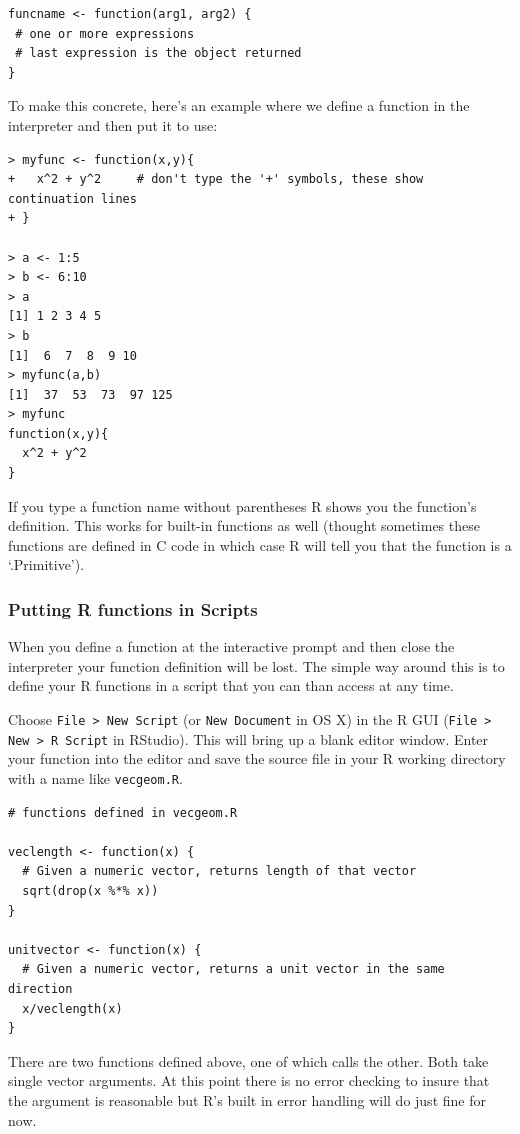\documentclass{article}
\begin{document}
\begin{lstlisting}
funcname <- function(arg1, arg2) {
 # one or more expressions
 # last expression is the object returned
}
\end{lstlisting}
To make this concrete, here's an example where we define a function in
the interpreter and then put it to use:

\begin{lstlisting}
> myfunc <- function(x,y){
+   x^2 + y^2     # don't type the '+' symbols, these show continuation lines
+ }

> a <- 1:5
> b <- 6:10
> a
[1] 1 2 3 4 5
> b
[1]  6  7  8  9 10
> myfunc(a,b)
[1]  37  53  73  97 125
> myfunc
function(x,y){
  x^2 + y^2
}
\end{lstlisting}
If you type a function name without parentheses R shows you the
function's definition. This works for built-in functions as well
(thought sometimes these functions are defined in C code in which case R
will tell you that the function is a `.Primitive').

\subsubsection{Putting R functions in Scripts}

When you define a function at the interactive prompt and then close the
interpreter your function definition will be lost. The simple way around
this is to define your R functions in a script that you can than access
at any time.

Choose \lstinline!File > New Script! (or \lstinline!New Document! in OS
X) in the R GUI (\lstinline!File > New > R Script! in RStudio). This
will bring up a blank editor window. Enter your function into the editor
and save the source file in your R working directory with a name like
\lstinline!vecgeom.R!.

\begin{lstlisting}
# functions defined in vecgeom.R

veclength <- function(x) {
  # Given a numeric vector, returns length of that vector
  sqrt(drop(x %*% x))
}

unitvector <- function(x) {
  # Given a numeric vector, returns a unit vector in the same direction
  x/veclength(x)
}
\end{lstlisting}
There are two functions defined above, one of which calls the other.
Both take single vector arguments. At this point there is no error
checking to insure that the argument is reasonable but R's built in
error handling will do just fine for now.
\end{document}
